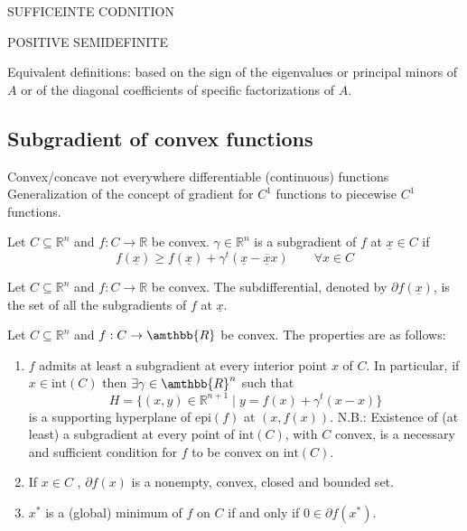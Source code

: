 SUFFICEINTE CODNITION 


POSITIVE SEMIDEFINITE 


Equivalent definitions: based on the sign of the eigenvalues or principal minors of $A$ or of the diagonal coeﬃcients of specific factorizations of $A$. 

\subsection{Subgradient of convex functions}
Convex/concave not everywhere diﬀerentiable (continuous) functions
Generalization of the concept of gradient for $C^1$ functions to piecewise $C^1$ functions.

\begin{definition}
    Let $C \subseteq\mathbb{R}^n$ and $f : C \rightarrow\mathbb{R}$ be convex.
    $\gamma\in \mathbb{R}^n$ is a subgradient of $f$ at $\underline{x}\in C$ if
    \[f (\underline{x}) \geq f (\underline{x}) + \gamma^t (\underline{x}-\underline{\overline{x}}x) \qquad \forall x \in C \]
\end{definition}
\begin{definition}
    Let $C \subseteq\mathbb{R}^n$ and $f : C \rightarrow\mathbb{R}$ be convex.
    The subdiﬀerential, denoted by $\partial f (\underline{x})$, is the set of all the subgradients of $f$ at $\underline{x}$.
\end{definition}
Let $C \subseteq\mathbb{R}^n$ and $f : C \rightarrow\amthbb{R}$ be convex.
The properties are as follows: 
\begin{enumerate}
    \item $f$ admits at least a subgradient at every interior point $x$ of $C$.
        In particular, if $x \in\text{int}(C)$ then $\exists\gamma\in\amthbb{R}^n$ such that
        \[H= \{(x,y ) \in\mathbb{R}^{n+1} \mid y = f (x) + \gamma^t (x-x)\}\]
        is a supporting hyperplane of $\text{epi}(f)$ at $(x,f (x))$.
        N.B.: Existence of (at least) a subgradient at every point of $\text{int}(C )$, with $C$ convex, is a necessary and suﬃcient condition for $f$ to be convex on $\text{int}(C)$.
    \item If $x ∈C$ , $\partial f (x)$ is a nonempty, convex, closed and bounded set.
    \item $x^\ast$ is a (global) minimum of $f$ on $C$ if and only if $0 \in\partial f (x^\ast)$.
\end{enumerate}